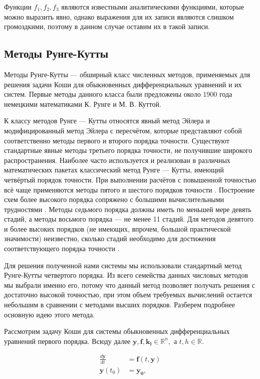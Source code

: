 \documentclass{article}
\begin{document}
Функции $f_1, f_2, f_3$ являются известными аналитическими функциями, которые можно выразить явно, однако выражения для их записи являются слишком громоздкими, поэтому в данном случае оставим их в такой записи.

\subsection{Методы Рунге-Кутты}
Методы Рунге-Кутты --- обширный класс численных методов, применяемых для решения задачи Коши для обыкновенных дифференциальных уравнений и их систем. Первые методы данного класса были предложены около 1900 года немецкими математиками К. Рунге и М. В. Куттой. 

К классу методов Рунге — Кутты относятся явный метод Эйлера и модифицированный метод Эйлера с пересчётом, которые представляют собой соответственно методы первого и второго порядка точности. Существуют стандартные явные методы третьего порядка точности, не получившие широкого распространения. Наиболее часто используется и реализован в различных математических пакетах классический метод Рунге — Кутты, имеющий четвёртый порядок точности. При выполнении расчётов с повышенной точностью всё чаще применяются методы пятого и шестого порядков точности \cite{ref5,ref6}. Построение схем более высокого порядка сопряжено с большими вычислительными трудностями \cite{ref7}. Методы седьмого порядка должны иметь по меньшей мере девять стадий, а методы восьмого порядка — не менее 11 стадий. Для методов девятого и более высоких порядков (не имеющих, впрочем, большой практической значимости) неизвестно, сколько стадий необходимо для достижения соответствующего порядка точности \cite{ref7}.

Для решения полученной нами системы мы использовали стандартный метод Рунге-Кутты четвертого порядка. Из всего семейства данных числовых методов мы выбрали именно его, потому что данный метод позволяет получать решения с достаточно высокой точностью, при этом объем требуемых вычислений остается небольшим в сравнении с методами высших порядков. Разберем подробнее основную идею этого метода.

Рассмотрим задачу Коши для системы обыкновенных дифференциальных уравнений первого порядка. Всюду далее $\boldsymbol{y}, \boldsymbol{f},\boldsymbol{k_i} \in \mathbb{R}^n,$ а $t,h \in \mathbb{R}.$

\begin{align*}
\frac{d\boldsymbol{y}}{dt} &= \boldsymbol{f}(t,\boldsymbol{y})\\
\boldsymbol{y}(t_0) &= \boldsymbol{y_0},
\end{align*}
\end{document}
